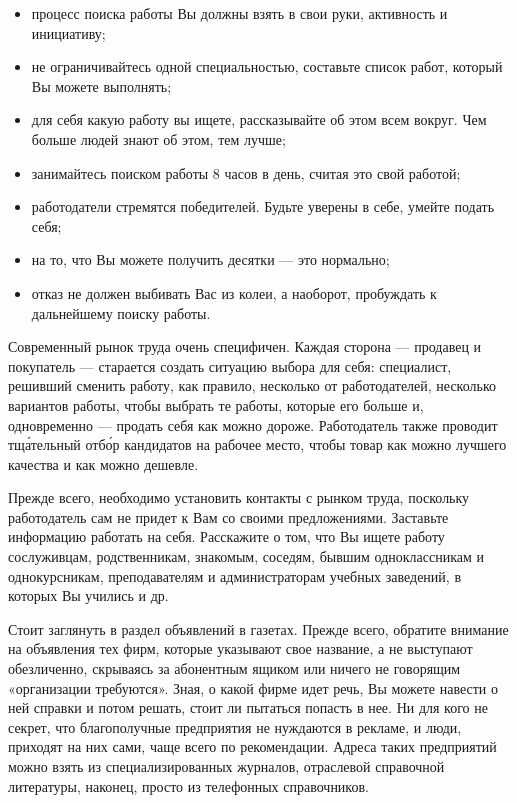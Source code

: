 \begin{itemize}[noitemsep, label=--]
    \item процесс поиска работы Вы должны взять в свои руки,  активность и инициативу;
    \item не ограничивайтесь одной специальностью, составьте список работ, который Вы можете выполнять;
    \item {} для себя какую работу вы ищете, рассказывайте об этом всем вокруг. Чем больше людей знают об этом, тем лучше;
    \item занимайтесь поиском работы 8 часов в день, считая это свой работой;
    \item работодатели стремятся  победителей. Будьте уверены в себе, умейте подать себя;
    \item {} на то, что Вы можете получить десятки  --- это нормально;
    \item {} отказ не должен выбивать Вас из колеи, а наоборот, пробуждать к дальнейшему поиску работы.
\end{itemize}

Современный рынок труда очень специфичен. Каждая сторона --- продавец и покупатель --- старается создать ситуацию выбора для себя: специалист, решивший сменить работу, как правило,  несколько  от работодателей, несколько вариантов работы, чтобы выбрать те  работы, которые его больше  и, одновременно --- продать себя как можно дороже. Работодатель также проводит тщ\'{а}тельный отб\'{о}р кандидатов на рабочее место, чтобы  товар как можно лучшего качества и как можно дешевле.

Прежде всего, необходимо установить контакты с рынком труда, поскольку работодатель сам не придет к Вам со своими предложениями. Заставьте информацию работать на себя. Расскажите о том, что Вы ищете работу сослуживцам, родственникам, знакомым, соседям, бывшим одноклассникам и однокурсникам, преподавателям и администраторам учебных заведений, в которых Вы учились и др.

Стоит заглянуть в раздел объявлений в газетах. Прежде всего, обратите внимание на объявления тех фирм, которые указывают свое название, а не выступают обезличенно, скрываясь за абонентным ящиком или ничего не говорящим «организации требуются». Зная, о какой фирме идет речь, Вы можете навести о ней справки и потом решать, стоит ли пытаться попасть в нее. Ни для кого не секрет, что благополучные предприятия не нуждаются в рекламе, и люди, приходят на них сами, чаще всего по рекомендации. Адреса таких предприятий можно взять из специализированных журналов, отраслевой справочной литературы, наконец, просто из телефонных справочников.

